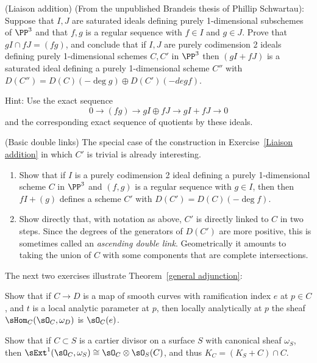 \begin{exercise} (Liaison addition)\label{Liaison addition}
(From the unpublished Brandeis thesis of Phillip Schwartau):
Suppose that $I, J$ are saturated ideals defining purely 1-dimensional subschemes of $\PP^3$
and that $f,g$ is a regular sequence with $f\in I$ and $g\in J$.
Prove that $g I \cap fJ = (fg)$, and conclude that if $I,J$ are purely codimension 2 ideals
 defining purely 1-dimensional schemes $C,C'$ in $\PP^3$
 then  $(gI+fJ)$ is a saturated ideal defining a purely 1-dimensional
scheme $C''$ with $D(C'') = D(C)(-\deg g) \oplus D(C')(-deg f)$.

Hint: Use the exact sequence 
$$
0\to (fg) \to gI \oplus fJ \to gI+fJ \to 0
$$
and the corresponding exact sequence of quotients by these ideals.
\end{exercise}


\begin{exercise}(Basic double links)\label{Basic double links}
The special case of the construction in Exercise~\ref{Liaison addition} in which $C'$ is trivial is already interesting. 

\begin{enumerate}
 \item Show that if $I$ is a purely codimension 2 ideal
 defining a purely 1-dimensional scheme $C$ in $\PP^3$
 and $(f, g)$ is a regular sequence with $g\in I$, then
 then  $fI+(g)$ defines a scheme $C'$ with $D(C') = D(C)(-\deg f)$.

 \item Show directly that, with notation as above, $C'$ is directly linked to $C$
 in two steps.  Since the degrees of the generators of $D(C')$ are more positive, this
 is sometimes called an \emph{ascending double link}. Geometrically it amounts to taking the
 union of $C$ with some  components that are complete intersections.
 \end{enumerate}

\end{exercise}

The next two exercises illustrate Theorem~\ref{general adjunction}:

\begin{exercise}\label{codimension0}
Show that if $C\to D$ is a map of smooth curves with ramification index $e$ at $p\in C$, and $t$ is a local
analytic parameter at $p$, then 
locally analytically at $p$ the sheaf $\sHom_C(\sO_C, \omega_D)$ is $\sO_C(e)$.
\end{exercise}

\begin{exercise}\label{codimension1}
 Show that if $C\subset S$ is a cartier divisor on a surface $S$ with canonical sheaf $\omega_S$, 
 then $\sExt^1(\sO_C, \omega_S) \cong \sO_C\otimes \sO_S(C)$, and thus $K_C = (K_S+C)\cap C$.
\end{exercise}



